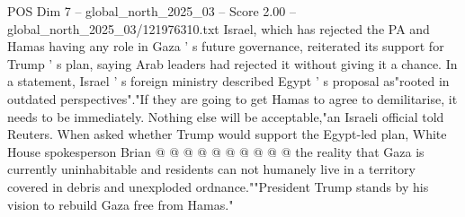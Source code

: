 \begin{textsample}{POS Dim 7 – global\_north\_2025\_03 – Score 2.00 – global\_north\_2025\_03/121976310.txt}
Israel, which has rejected the PA and Hamas having any role in Gaza ' s future governance, reiterated its support for Trump ' s plan, saying Arab leaders had rejected it without giving it a chance.
In a statement, Israel ' s foreign ministry described Egypt ' s proposal as"rooted in outdated perspectives"."If they are going to get Hamas to agree to demilitarise, it needs to be immediately.
Nothing else will be acceptable,"an Israeli official told Reuters.
When asked whether Trump would support the Egypt-led plan, White House spokesperson Brian @ @ @ @ @ @ @ @ @ @ the reality that Gaza is currently uninhabitable and residents can not humanely live in a territory covered in debris and unexploded ordnance.""President Trump stands by his vision to rebuild Gaza free from Hamas."

\end{textsample}
